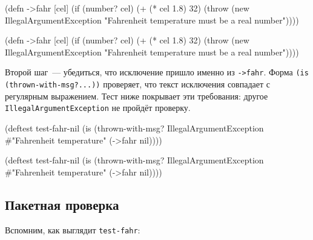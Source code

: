 \ifx\devicetype\mobile

\begin{english}
  \begin{clojure}
(defn ->fahr [cel]
  (if (number? cel)
    (+ (* cel 1.8) 32)
    (throw (new IllegalArgumentException
             "Fahrenheit temperature
              must be a real number"))))
  \end{clojure}
\end{english}

\else

\begin{english}
  \begin{clojure}
(defn ->fahr [cel]
  (if (number? cel)
    (+ (* cel 1.8) 32)
    (throw (new IllegalArgumentException
            "Fahrenheit temperature must be a real number"))))
  \end{clojure}
\end{english}

\fi

Второй шаг~--- убедиться, что исключение пришло именно из \verb|->fahr|. Форма
\verb|(is (thrown-with-msg?...))| проверяет, что текст исключения совпадает с
регулярным выражением. Тест ниже покрывает эти требования: другое
\verb|IllegalArgumentException| не пройдёт проверку.

\ifx\devicetype\mobile

\begin{english}
  \begin{clojure}
(deftest test-fahr-nil
  (is (thrown-with-msg?
       IllegalArgumentException
       #"Fahrenheit temperature"
       (->fahr nil))))
  \end{clojure}
\end{english}

\else

\begin{english}
  \begin{clojure}
(deftest test-fahr-nil
  (is (thrown-with-msg?
       IllegalArgumentException #"Fahrenheit temperature"
       (->fahr nil))))
  \end{clojure}
\end{english}

\fi

\subsection{Пакетная проверка}

Вспомним, как выглядит \verb|test-fahr|:

